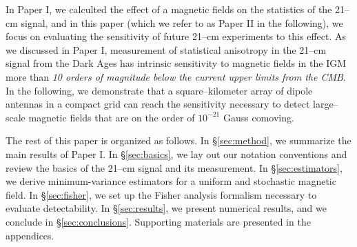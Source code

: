 In Paper I, we calculted the effect of a magnetic fields on the statistics of the 21--cm signal, and in this paper (which we refer to as Paper II in the following), we focus on evaluating the sensitivity of future 21--cm experiments to this effect. As we discussed in Paper I, measurement of statistical anisotropy in the 21--cm signal from the Dark Ages has intrinsic sensitivity to magnetic fields in the IGM more than \textit{10 orders of magnitude below the current upper limits from the CMB}. In the following, we demonstrate that a square--kilometer array of dipole antennas in a compact grid can reach the sensitivity necessary to detect large--scale magnetic fields that are on the order of $10^{-21}$ Gauss comoving. 

The rest of this paper is organized as follows. In \S\ref{sec:method}, we summarize the main results of Paper I. In \S\ref{sec:basics}, we lay out our notation conventions and review the basics of the 21--cm signal and its measurement. In \S\ref{sec:estimators}, we derive minimum-variance estimators for a uniform and stochastic magnetic field. In \S\ref{sec:fisher}, we set up the Fisher analysis formalism necessary to evaluate detectability. In \S\ref{sec:results}, we present numerical results, and we conclude in \S\ref{sec:conclusions}. Supporting materials are presented in the appendices.